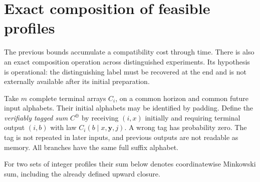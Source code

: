 \section{Exact composition of feasible profiles}
\label{sec:composition}
The previous bounds accumulate a compatibility cost through time.
There is also an exact composition operation across distinguished
experiments. Its hypothesis is operational: the distinguishing label
must be recovered at the end and is not externally available after its
initial preparation.

Take $m$ complete terminal arrays $C_i$, on a common horizon and common
future input alphabets. Their initial alphabets may be identified by
padding. Define the \emph{verifiably tagged sum} $C^\oplus$ by receiving
$(i,x)$ initially and requiring terminal output $(i,b)$ with law
$C_i(b\mid x,\mathbf y,j)$. A wrong tag has probability zero. The tag
is not repeated in later inputs, and previous outputs are not readable
as memory. All branches have the same full suffix alphabet.

For two sets of integer profiles their sum below denotes coordinatewise
Minkowski sum, including the already defined upward closure.


